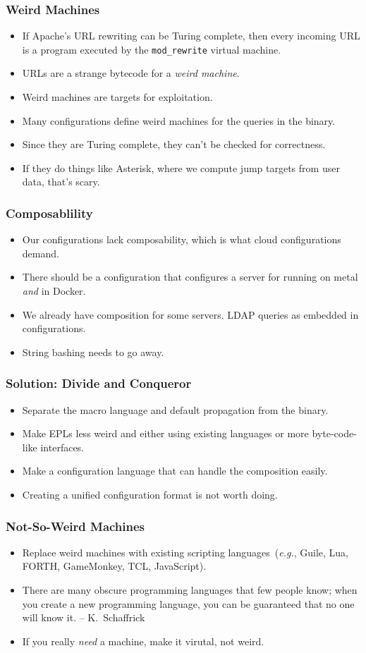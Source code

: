 \documentclass{beamer}
\begin{document}
\begin{frame}\frametitle{Weird Machines}
\begin{itemize}
\item If Apache's URL rewriting can be Turing complete, then every incoming URL is a program executed by the \texttt{mod\_rewrite} virtual machine.
\item URLs are a strange bytecode for a \emph{weird machine}.
\item Weird machines are targets for exploitation.
\item Many configurations define weird machines for the queries in the binary.
\item Since they are Turing complete, they can't be checked for correctness.
\item If they do things like Asterisk, where we compute jump targets from user data, that's scary.
\end{itemize}
\end{frame}

\begin{frame}\frametitle{Composablility}
\begin{itemize}
\item Our configurations lack composability, which is what cloud configurations demand.
\item There should be a configuration that configures a server for running on metal \emph{and} in Docker.
\item We already have composition for some servers. LDAP queries as embedded in configurations.
\item String bashing needs to go away.
\end{itemize}
\end{frame}

\begin{frame}\frametitle{Solution: Divide and Conqueror}
\begin{itemize}
\item Separate the macro language and default propagation from the binary.
\item Make EPLs less weird and either using existing languages or more byte-code-like interfaces.
\item Make a configuration language that can handle the composition easily.
\item Creating a unified configuration format is not worth doing.
\end{itemize}
\end{frame}

\begin{frame}\frametitle{Not-So-Weird Machines}
\begin{itemize}
\item Replace weird machines with existing scripting languages~(\emph{e.g.}, Guile, Lua, FORTH, GameMonkey, TCL, JavaScript).
\item There are many obscure programming languages that few people know; when you create a new programming language, you can be guaranteed that no one will know it. -- K.~Schaffrick
\item If you really \emph{need} a machine, make it virutal, not weird.
\end{itemize}
\end{frame}
\end{document}

